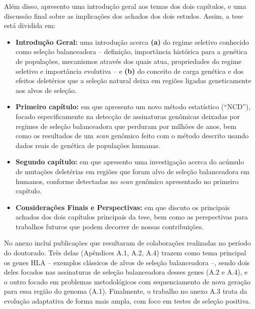Além disso, apresento uma introdução geral aos temas dos dois capítulos, e uma discussão final sobre as implicações dos achados dos dois estudos.
%
Assim, a tese está dividida em:
%
\begin{itemize}
%
\item \textbf{Introdução Geral:} uma introdução acerca \textbf{(a)} do
regime seletivo conhecido como seleção balanceadora -- definição,
importância histórica para a genética de populações, mecanismos através
dos quais atua, propriedades do regime seletivo e importância evolutiva
-- e \textbf{(b)} do conceito de carga genética e dos efeitos deletérios que a seleção natural deixa em regiões ligadas geneticamente aos alvos de seleção.
%
\item \textbf{Primeiro capítulo:} em que apresento um novo método estatístico (\enquote{NCD}), focado especificamente na detecção de assinaturas genômicas deixadas por regimes de seleção balanceadora que perduram por milhões de anos, bem como os resultados de um \emph{scan} genômico feito com o método descrito usando dados reais de genética de populações humanas.
%
\item \textbf{Segundo capítulo:} em que apresento uma investigação
acerca do acúmulo de mutações deletérias em regiões que foram alvo de
seleção balanceadora em humanos, conforme detectadas no \emph{scan} genômico apresentado no primeiro capítulo.
%
\item \textbf{Considerações Finais e Perspectivas:} em que discuto os principais achados dos dois capítulos principais da tese, bem como as perspectivas para trabalhos futuros que podem decorrer de nossas contribuições.
\end{itemize}
%

No anexo incluí publicações que resultaram de colaborações realizadas no período do doutorado. Três delas (Apêndices A.1, A.2, A.4) trazem como tema principal os genes HLA -- exemplos clássicos de alvos de seleção balanceadora --, sendo dois deles focados nas assinaturas de seleção balanceadora desses genes (A.2 e A.4), e o outro focado em problemas metodológicos com sequenciamento de nova geração para essa região do genoma (A.1). Finalmente, o trabalho no anexo A.3 trata da evolução adaptativa de forma mais ampla, com foco em testes de seleção positiva. 
    
